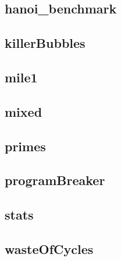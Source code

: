 \subsection{hanoi\_benchmark}
    \begin{figure}[h]
	    \centering
		
	\end{figure}
    


\newpage
\subsection{killerBubbles}
    \begin{figure}[h]
	    \centering
		
	\end{figure}
    


\newpage
\subsection{mile1}
    \begin{figure}[h]
	    \centering
		
	\end{figure}
    


\newpage
\subsection{mixed}
    \begin{figure}[h]
	    \centering
		
	\end{figure}
    


\newpage
\subsection{primes}
    \begin{figure}[h]
	    \centering
		
	\end{figure}
    


\newpage
\subsection{programBreaker}
    \begin{figure}[h]
	    \centering
		
	\end{figure}
    


\newpage
\subsection{stats}
    \begin{figure}[h]
	    \centering
		
	\end{figure}
    


\newpage
\subsection{wasteOfCycles}
    \begin{figure}[h]
	    \centering
		
	\end{figure}
    

